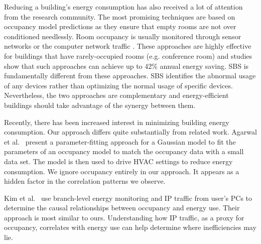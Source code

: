 Reducing a building's energy consumption has also received a lot of attention from the research community.
The most promising techniques are based on occupancy model predictions as they ensure that empty rooms are not over conditioned needlessly.
Room occupancy is usually monitored through sensor networks \cite{agarwal:ipsn2011,erickson:ipsn2011} or the computer network traffic \cite{kim:buildsys2010}.
These approaches are highly effective for buildings that have rarely-occupied rooms (e.g. conference room) and studies show that such approaches
 can achieve up to 42\% annual energy saving.
SBS is fundamentally different from these approaches.  SBS identifies the abnormal usage of any devices rather than optimizing the normal usage of specific devices.
Nevertheless, the two approaches are complementary and energy-efficient buildings should take advantage of the synergy between them.

Recently, there has been increased interest in minimizing building energy consumption.  Our approach
differs quite substantially from related work.
Agarwal et al.~\cite{occmodels_buildsys11} present a parameter-fitting 
approach for a Gaussian model to fit the parameters of an occupancy model to match the occupancy data 
with a small data set.  
The model is then used to drive HVAC settings to reduce energy consumption.  We ignore occupancy entirely 
in our approach.  It appears as a hidden factor in the correlation patterns we observe.

Kim et al.~\cite{kim:buildsys2010} use branch-level energy monitoring and IP traffic from user's PCs to determine the
causal relationships between occupancy and energy use.  Their approach is most similar to ours.  Understanding how IP 
traffic, as a proxy for occupancy, correlates with energy use can help determine where inefficiencies may lie.



